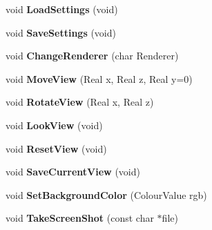 \begin{DoxyCompactItemize}
\item 
\hypertarget{class_p_f_d_application_a3359080b123fc8468ef352afa2fc20b4}{
void {\bfseries LoadSettings} (void)}
\label{class_p_f_d_application_a3359080b123fc8468ef352afa2fc20b4}

\item 
\hypertarget{class_p_f_d_application_aa466a652d7283dee549bd3a7c8794bad}{
void {\bfseries SaveSettings} (void)}
\label{class_p_f_d_application_aa466a652d7283dee549bd3a7c8794bad}

\item 
\hypertarget{class_p_f_d_application_a67dbf815ba82bad31f528e88d9f0f798}{
void {\bfseries ChangeRenderer} (char Renderer)}
\label{class_p_f_d_application_a67dbf815ba82bad31f528e88d9f0f798}

\item 
\hypertarget{class_p_f_d_application_a31786506aa0a7fd47a7723a25c793c65}{
void {\bfseries MoveView} (Real x, Real z, Real y=0)}
\label{class_p_f_d_application_a31786506aa0a7fd47a7723a25c793c65}

\item 
\hypertarget{class_p_f_d_application_a65b7de8403d337d09ccd054b344a2e5e}{
void {\bfseries RotateView} (Real x, Real z)}
\label{class_p_f_d_application_a65b7de8403d337d09ccd054b344a2e5e}

\item 
\hypertarget{class_p_f_d_application_ac871b8b4f206b5e882b37fac50b5b84b}{
void {\bfseries LookView} (void)}
\label{class_p_f_d_application_ac871b8b4f206b5e882b37fac50b5b84b}

\item 
\hypertarget{class_p_f_d_application_a02c8a0d501851660681db77930064140}{
void {\bfseries ResetView} (void)}
\label{class_p_f_d_application_a02c8a0d501851660681db77930064140}

\item 
\hypertarget{class_p_f_d_application_a3503e63dcd17d3b9fa6153cefe51e249}{
void {\bfseries SaveCurrentView} (void)}
\label{class_p_f_d_application_a3503e63dcd17d3b9fa6153cefe51e249}

\item 
\hypertarget{class_p_f_d_application_af0bb6534bbe9b2c0f8a37b12b3104176}{
void {\bfseries SetBackgroundColor} (ColourValue rgb)}
\label{class_p_f_d_application_af0bb6534bbe9b2c0f8a37b12b3104176}

\item 
\hypertarget{class_p_f_d_application_a06d09a478b988967bda69c0d536d4610}{
void {\bfseries TakeScreenShot} (const char $\ast$file)}
\label{class_p_f_d_application_a06d09a478b988967bda69c0d536d4610}


\end{DoxyCompactItemize}

